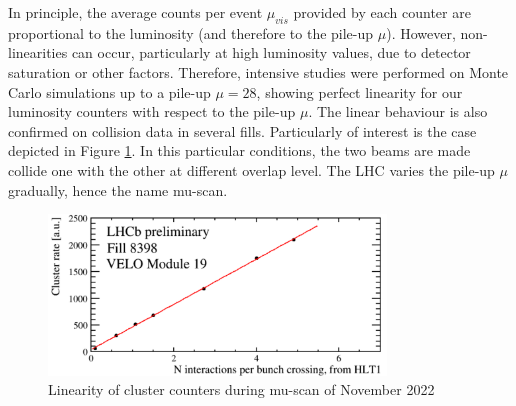 %
%
In principle, the average counts per event $\mu_{vis}$ provided by each counter are proportional to the luminosity (and therefore to the pile-up $\mu$). However, non-linearities can occur, particularly at high luminosity values, due to detector saturation or other factors. Therefore, intensive studies were performed on Monte Carlo simulations up to a pile-up $\mu = 28$, showing perfect linearity for our luminosity counters\cite{dan} with respect to the pile-up $\mu$. The linear behaviour is also confirmed on collision data in several fills. Particularly of interest is the case depicted in Figure \ref{fig:muscan}. In this particular conditions, the two beams are made collide one with the other at different overlap level. The LHC varies the pile-up $\mu$ gradually,  hence the name  mu-scan.

\begin{figure}
    \centering
    \includegraphics[width=0.8\textwidth]{figures/muscan.png}
    \caption{Linearity of cluster counters during mu-scan of November 2022}
    \label{fig:muscan}
\end{figure}


